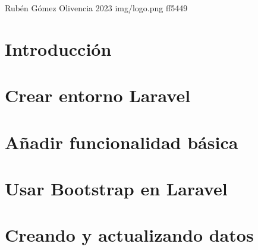 \documentclass{\ClassPath/yukibook}
\begin{document}
    {Rubén Gómez Olivencia}  %
    {2023}    %
    {} %
    {} %
    {} %
    {img/logo.png} %
    {ff5449}
    {} %

    \coverpage
    \graphicspath{{../../yukibook.cls/}}
    \licensepage
    \tableofcontents

    \graphicspath{{img/}}

    \part{Introducción}
    
    

    \part{Crear entorno Laravel}
    
    

    \part{Añadir funcionalidad básica}
    

    \part{Usar Bootstrap en Laravel}
    

    \part{Creando y actualizando datos}
    
\end{document}
